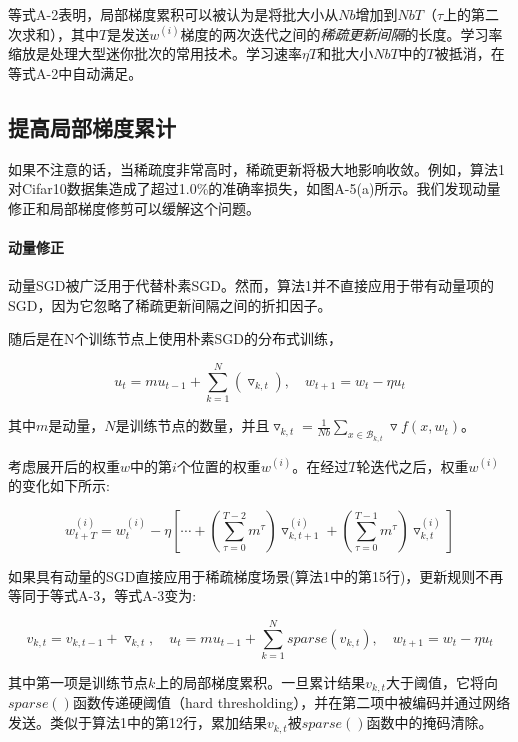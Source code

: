 等式A-2表明，局部梯度累积可以被认为是将批大小从$Nb$增加到$NbT$（$\tau$上的第二次求和），其中$T$是发送$w^{(i)}$梯度的两次迭代之间的\emph{稀疏更新间隔}的长度。学习率缩放是处理大型迷你批次的常用技术。学习速率$\eta T$和批大小$NbT$中的$T$被抵消，在等式A-2中自动满足。

\subsection{提高局部梯度累计}
如果不注意的话，当稀疏度非常高时，稀疏更新将极大地影响收敛。例如，算法1对Cifar10数据集造成了超过1.0\%的准确率损失，如图A-5(a)所示。我们发现动量修正和局部梯度修剪可以缓解这个问题。

\paragraph{动量修正}
动量SGD被广泛用于代替朴素SGD。然而，算法1并不直接应用于带有动量项的SGD，因为它忽略了稀疏更新间隔之间的折扣因子。

随后是在N个训练节点上使用朴素SGD的分布式训练，

\begin{equation}
	\label{eq:msgd}
	u_{t} = mu_{t-1} + \sum_{k=1}^{N}\left( \triangledown_{k,t}\right),\quad  w_{t+1} = w_{t} - \eta u_{t}
\end{equation}

其中$m$是动量，$N$是训练节点的数量，并且$\triangledown_{k,t} =  \frac{1}{Nb} \sum_{x \in \mathcal{B}_{k, t}} \triangledown f(x, w_{t})$。

考虑展开后的权重$w$中的第$i$个位置的权重$w^{(i)}$。在经过$T$轮迭代之后，权重$w^{(i)}$的变化如下所示:

\begin{equation}
	\label{eq:msgd_change}
	w_{t+T}^{(i)} = w_{t}^{(i)} - \eta \left[\cdots +  \left( \sum_{\tau=0}^{T-2} m^{\tau}\right)\triangledown^{(i)}_{k,t+1} + \left( \sum_{\tau=0}^{T-1} m^{\tau}\right)\triangledown^{(i)}_{k,t}\right]
\end{equation}

如果具有动量的SGD直接应用于稀疏梯度场景(算法1中的第15行)，更新规则不再等同于等式A-3，等式A-3变为:

\begin{equation}
	\label{eq:nomc}
	v_{k,t} = v_{k,t-1} + \triangledown_{k, t},\quad u_{t} = mu_{t-1} + \sum_{k=1}^{N} sparse\left( v_{k, t}\right) ,\quad  w_{t+1} = w_{t} - \eta u_{t}
\end{equation}

其中第一项是训练节点$k$上的局部梯度累积。一旦累计结果$v_{k,t}$大于阈值，它将向$sparse()$函数传递硬阈值（hard thresholding），并在第二项中被编码并通过网络发送。类似于算法1中的第12行，累加结果$v_{k,t}$被$sparse()$函数中的掩码清除。

